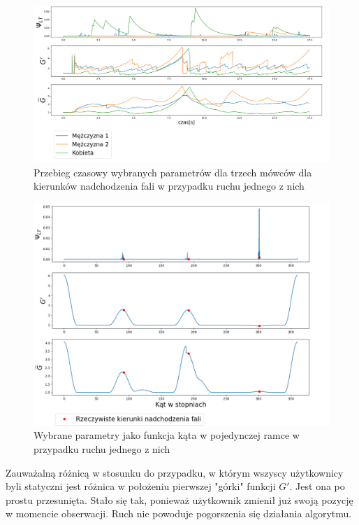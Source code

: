 \begin{figure}[h!]
    \centering
    \includegraphics[width=\textwidth]{Images/moving_params_in_time.png}
    \caption{Przebieg czasowy wybranych parametrów dla trzech mówców dla kierunków nadchodzenia fali w przypadku ruchu jednego z nich}
    \label{fig:moving_params_in_time}
\end{figure}

\begin{figure}[H]
    \centering
    \includegraphics[width=\textwidth]{Images/moving_params_in_angle.png}
    \caption{Wybrane parametry jako funkcja kąta w pojedynczej ramce w przypadku ruchu jednego z nich}
    \label{fig:moving_params_in_angle}
\end{figure}

\noindent Zauważalną różnicą w stosunku do przypadku, w którym wszyscy użytkownicy byli statyczni jest różnica w położeniu pierwszej "górki" funkcji $G'$. Jest ona po prostu przesunięta. Stało się tak, ponieważ użytkownik zmienił już swoją pozycję w momencie obserwacji. Ruch nie powoduje pogorszenia się działania algorytmu.

